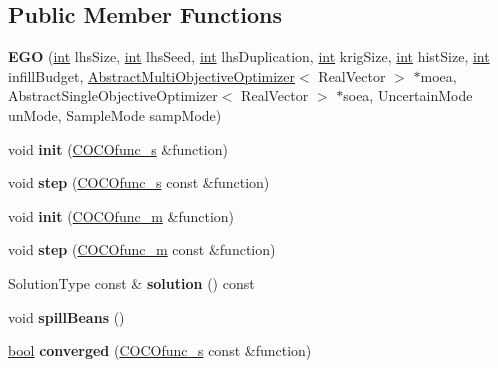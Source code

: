 \subsection*{Public Member Functions}
\begin{DoxyCompactItemize}
\item 
{\bfseries E\+GO} (\hyperlink{classint}{int} lhs\+Size, \hyperlink{classint}{int} lhs\+Seed, \hyperlink{classint}{int} lhs\+Duplication, \hyperlink{classint}{int} krig\+Size, \hyperlink{classint}{int} hist\+Size, \hyperlink{classint}{int} infill\+Budget, \hyperlink{classAbstractMultiObjectiveOptimizer}{Abstract\+Multi\+Objective\+Optimizer}$<$ Real\+Vector $>$ $\ast$moea, Abstract\+Single\+Objective\+Optimizer$<$ Real\+Vector $>$ $\ast$soea, Uncertain\+Mode un\+Mode, Sample\+Mode samp\+Mode)\hypertarget{classEGO_a7f8c5b60fcfe2c2902f0d06281bd6f9b}{}\label{classEGO_a7f8c5b60fcfe2c2902f0d06281bd6f9b}

\item 
void {\bfseries init} (\hyperlink{classCOCOfunc__s}{C\+O\+C\+Ofunc\+\_\+s} \&function)\hypertarget{classEGO_ad5a1202c789aad762634fe3e487a4dbe}{}\label{classEGO_ad5a1202c789aad762634fe3e487a4dbe}

\item 
void {\bfseries step} (\hyperlink{classCOCOfunc__s}{C\+O\+C\+Ofunc\+\_\+s} const \&function)\hypertarget{classEGO_a11d0a1a4c958406d3eb949304f393c7a}{}\label{classEGO_a11d0a1a4c958406d3eb949304f393c7a}

\item 
void {\bfseries init} (\hyperlink{classCOCOfunc__m}{C\+O\+C\+Ofunc\+\_\+m} \&function)\hypertarget{classEGO_ac87e0daa32889961cd4b53533121557b}{}\label{classEGO_ac87e0daa32889961cd4b53533121557b}

\item 
void {\bfseries step} (\hyperlink{classCOCOfunc__m}{C\+O\+C\+Ofunc\+\_\+m} const \&function)\hypertarget{classEGO_a1fbf70d8571ef46ce15a4e014b110187}{}\label{classEGO_a1fbf70d8571ef46ce15a4e014b110187}

\item 
Solution\+Type const \& {\bfseries solution} () const \hypertarget{classEGO_a58462b52c527225ebdee9be5300f56ac}{}\label{classEGO_a58462b52c527225ebdee9be5300f56ac}

\item 
void {\bfseries spill\+Beans} ()\hypertarget{classEGO_a7a5aad979f09a2f6aa229917a85bfce1}{}\label{classEGO_a7a5aad979f09a2f6aa229917a85bfce1}

\item 
\hyperlink{classbool}{bool} {\bfseries converged} (\hyperlink{classCOCOfunc__s}{C\+O\+C\+Ofunc\+\_\+s} const \&function)\hypertarget{classEGO_ad93da2f386b41273e54a440a5c2b39eb}{}\label{classEGO_ad93da2f386b41273e54a440a5c2b39eb}


\end{DoxyCompactItemize}

